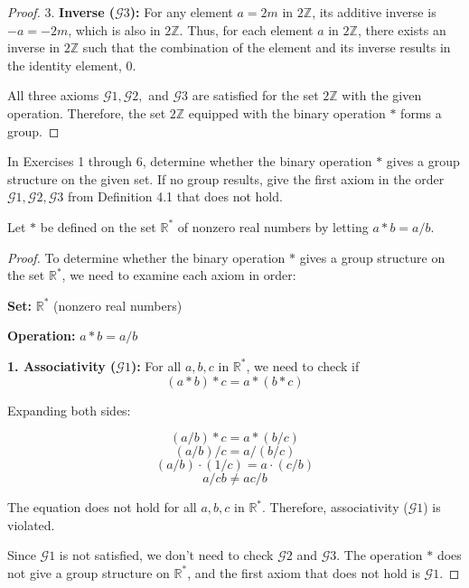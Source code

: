 \documentclass[12pt]{amsart}
\theoremstyle{definition}
\numberwithin{equation}{section}
\theoremstyle{plain}
\newcommand{\R}{\mathbb{R}}
\begin{document}
\begin{exercise}{2}
\begin{proof}
3. \textbf{Inverse (\(\mathcal{G}3\)):}
For any element \(a = 2m\) in \(2 \mathbb{Z}\), its additive inverse is \(-a = -2m\), which is also in \(2 \mathbb{Z}\). Thus, for each element \(a\) in \(2 \mathbb{Z}\), there exists an inverse in \(2 \mathbb{Z}\) such that the combination of the element and its inverse results in the identity element, 0.

All three axioms \(\mathcal{G}1, \mathcal{G}2,\) and \(\mathcal{G}3\) are satisfied for the set \(2 \mathbb{Z}\) with the given operation. Therefore, the set \(2 \mathbb{Z}\) equipped with the binary operation \(*\) forms a group.

    \end{proof}
    \end{exercise}
    \begin{exercise}{5}
    In Exercises 1 through 6, determine whether the binary operation $*$ gives a group structure on the given set. If no group results, give the first axiom in the order $\mathcal{G}1,\mathcal{G}2,\mathcal{G}3$ from Definition 4.1 that does not hold.
    
    Let $*$ be defined on the set $\R^*$ of nonzero real numbers by letting $a *b = a/b$.
    \begin{proof}
        To determine whether the binary operation \( * \) gives a group structure on the set \( \mathbb{R}^* \), we need to examine each axiom in order:

\textbf{Set:} \( \mathbb{R}^* \) (nonzero real numbers)

\textbf{Operation:} \( a * b = a/b \)

\textbf{1. Associativity (\( \mathcal{G}1 \)):}
For all \( a, b, c \) in \( \mathbb{R}^* \), we need to check if  
\[ (a * b) * c = a * (b * c) \]

Expanding both sides:

\[ (a/b) * c = a * (b/c) \]  
\[ (a/b) / c = a / (b/c) \]  
\[ (a/b) \cdot (1/c) = a \cdot (c/b) \]  
\[ a/cb \neq ac/b \]

The equation does not hold for all \( a, b, c \) in \( \mathbb{R}^* \). Therefore, associativity (\( \mathcal{G}1 \)) is violated.

Since \( \mathcal{G}1 \) is not satisfied, we don't need to check \( \mathcal{G}2 \) and \( \mathcal{G}3 \). The operation \( * \) does not give a group structure on \( \mathbb{R}^* \), and the first axiom that does not hold is \( \mathcal{G}1 \).
    \end{proof}
    \end{exercise}
    
\end{document}
